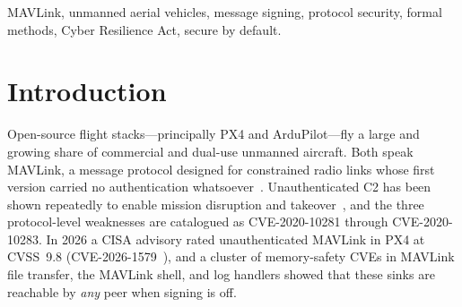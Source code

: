 \documentclass[conference]{IEEEtran}
\begin{document}
\begin{abstract}
our contribution is to measure it independently, to show that the model built
from the implementation reproduces it, and to make explicit that the exemption
follows the channel index rather than the link type (measured by moving the
transport of each channel independently), which motivates an active, read-only
probe. Third, we map each observed property to the essential
requirements of EU Regulation~2024/2847 (the Cyber Resilience Act) and the
command-link requirement of Delegated Regulation~2019/945. We claim no primacy
for that mapping: Annex~I crosswalks for drone products are already published
as compliance guidance, including ones that name unauthenticated MAVLink as the
control-link weakness to remediate, and the four-column crosswalk form itself
is established practice. What differs here is the content of the cells. Those
crosswalks map a requirement to an intended control; each row of ours is
anchored to a measurement taken from a running autopilot, with the record
published alongside it, including the rows where the measurement was
inconclusive and earned nothing. All code, models, and data are released for reproduction.
\end{abstract}

\begin{IEEEkeywords}
MAVLink, unmanned aerial vehicles, message signing, protocol security, formal
methods, Cyber Resilience Act, secure by default.
\end{IEEEkeywords}

\section{Introduction}
\label{sec:intro}

Open-source flight stacks---principally PX4 and ArduPilot---fly a large and
growing share of commercial and dual-use unmanned aircraft. Both speak
MAVLink, a message protocol designed for constrained radio links whose first
version carried no authentication whatsoever~\cite{marty2014}. Unauthenticated
C2 has been shown repeatedly to enable mission disruption and
takeover~\cite{kwon2018,marty2014}, and the three protocol-level weaknesses are
catalogued as CVE-2020-10281 through CVE-2020-10283. In 2026 a CISA advisory
rated unauthenticated MAVLink in PX4 at CVSS~9.8
(CVE-2026-1579~\cite{cisa_icsa2609002}), and a cluster
of memory-safety CVEs in MAVLink file transfer, the MAVLink shell, and log
handlers showed that these sinks are reachable by \emph{any} peer when signing
is off.
\end{document}
